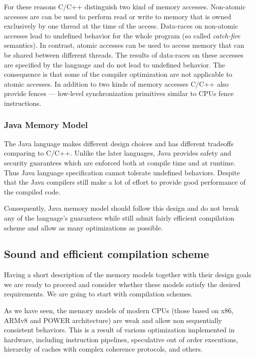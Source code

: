 \documentclass[a4paper,twoside,11pt]{article}
\numberwithin{equation}{section}
\begin{document}
For these reasons C/C++ distinguish two kind of memory accesses.
Non-atomic accesses are can be used to perform read or write to memory that 
is owned exclusively by one thread at the time of the access.
Data-races on non-atomic accesses lead to undefined behavior for the whole program
(so called \emph{catch-fire} semantics).
In contrast, atomic accesses can be used to access memory that can be shared between different threads. 
The results of data-races on these accesses are specified by the language and do not lead to undefined behavior.
The consequence is that some of the compiler optimization are not applicable to atomic accesses.
In addition to two kinds of memory accesses C/C++ also provide fences ---
low-level synchronization primitives similar to CPUs fence instructions.

\subsubsection{Java Memory Model}

The Java language makes different design choices and has different tradeoffs comparing to C/C++.
Unlike the later languages, Java provides safety and security guarantees
which are enforced both at compile time and at runtime.  
Thus Java language specification cannot tolerate undefined behaviors.
Despite that the Java compilers still make a lot of effort 
to provide good performance of the compiled code.

Consequently, Java memory model should follow this design 
and do not break any of the language's guarantees
while still admit fairly efficient compilation scheme
and allow as many optimizations as possible.

\subsection{Sound and efficient compilation scheme}

Having a short description of the memory models 
together with their design goals we are ready to proceed 
and consider whether these models satisfy the desired requirements.
We are going to start with compilation schemes.

As we have seen, the memory models of modern CPUs 
(those based on x86, ARMv8 and POWER architecture)
are weak and allow non sequentially consistent behaviors.
This is a result of various optimization implemented in hardware,
including instruction pipelines, speculative out of order executions, 
hierarchy of caches with complex coherence protocols, and others.
\end{document}
